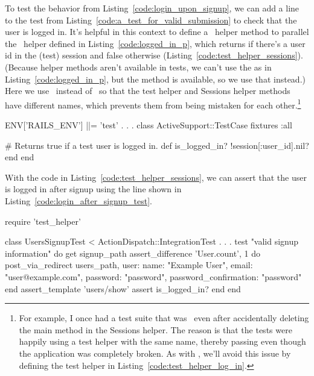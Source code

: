 To test the behavior from Listing~\ref{code:login_upon_signup}, we can add a line to the test from Listing~\ref{code:a_test_for_valid_submission} to check that the user is logged in. It's helpful in this context to define a \ helper method to parallel the \ helper defined in Listing~\ref{code:logged_in_p}, which returns  if there's a user id in the (test) session and false otherwise (Listing~\ref{code:test_helper_sessions}). (Because helper methods aren't available in tests, we can't use the  as in Listing~\ref{code:logged_in_p}, but the  method is available, so we use that instead.) Here we use \ instead of \ so that the test helper and Sessions helper methods have different names, which prevents them from being mistaken for each other.\footnote{For example, I once had a test suite that was \passing\ even after accidentally deleting the main  method in the Sessions helper. The reason is that the tests were happily using a test helper with the same name, thereby passing even though the application was completely broken. As with , we'll avoid this issue by defining the test helper  in Listing~\ref{code:test_helper_log_in}.}

\begin{codelisting}
\label{code:test_helper_sessions}
\begin{code}
ENV['RAILS_ENV'] ||= 'test'
.
.
.
class ActiveSupport::TestCase
  fixtures :all

  # Returns true if a test user is logged in.
  def is_logged_in?
    !session[:user_id].nil?
  end
end
\end{code}
\end{codelisting}

\noindent With the code in Listing~\ref{code:test_helper_sessions}, we can assert that the user is logged in after signup using the line shown in  Listing~\ref{code:login_after_signup_test}.

\begin{codelisting}
\label{code:login_after_signup_test}
\begin{code}
require 'test_helper'

class UsersSignupTest < ActionDispatch::IntegrationTest
  .
  .
  .
  test "valid signup information" do
    get signup_path
    assert_difference 'User.count', 1 do
      post_via_redirect users_path, user: { name:  "Example User",
                                            email: "user@example.com",
                                            password:              "password",
                                            password_confirmation: "password" }
    end
    assert_template 'users/show'
    assert is_logged_in?
  end
end
\end{code}
\end{codelisting}


